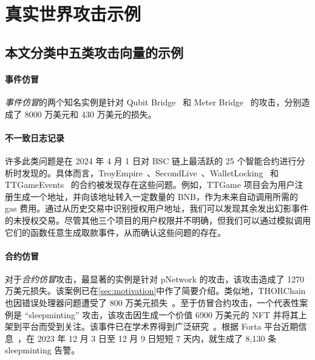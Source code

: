 \appendices


\section{真实世界攻击示例}

\subsection{本文分类中五类攻击向量的示例}
\label{appendix:examples}

\paragraph{事件仿冒}
\emph{事件仿冒}的两个知名实例是针对 Qubit Bridge~\cite{Qubit} 和 Meter Bridge~\cite{Meter} 的攻击，分别造成了 8000 万美元和 430 万美元的损失。

\paragraph{不一致日志记录}
许多此类问题是在 2024 年 4 月 1 日对 BSC 链上最活跃的 25 个智能合约进行分析时发现的。具体而言，TroyEmpire~\cite{TroyEmpire}、SecondLive~\cite{SecondLive}、WalletLocking~\cite{WalletLocking} 和 TTGameEvents~\cite{TTGame} 的合约被发现存在这些问题。例如，TTGame 项目会为用户注册生成一个地址，并向该地址转入一定数量的 BNB，作为未来自动调用所需的 gas 费用。通过从历史交易中识别授权用户地址，我们可以发现其余发出幻影事件的未授权交易。尽管其他三个项目的用户权限并不明确，但我们可以通过模拟调用它们的函数任意生成取款事件，从而确认这些问题的存在。

\paragraph{合约仿冒}
对于\emph{合约仿冒}攻击，最显著的实例是针对 pNetwork 的攻击，该攻击造成了 1270 万美元损失。该案例已在\cref{sec:motivation}中作了简要介绍。类似地，THORChain 也因错误处理器问题遭受了 800 万美元损失~\cite{thorchain}。至于仿冒合约攻击，一个代表性案例是 ``sleepminting'' 攻击，该攻击因生成一个价值 6900 万美元的 NFT 并将其上架到平台而受到关注。该事件已在学术界得到广泛研究~\cite{nft_sleepminting,clone_nft,sleepminting}。根据 Forta 平台近期信息~\cite{sleepminting_forta}，在 2023 年 12 月 3 日至 12 月 9 日短短 7 天内，就生成了 8,130 条 sleepminting 告警。

